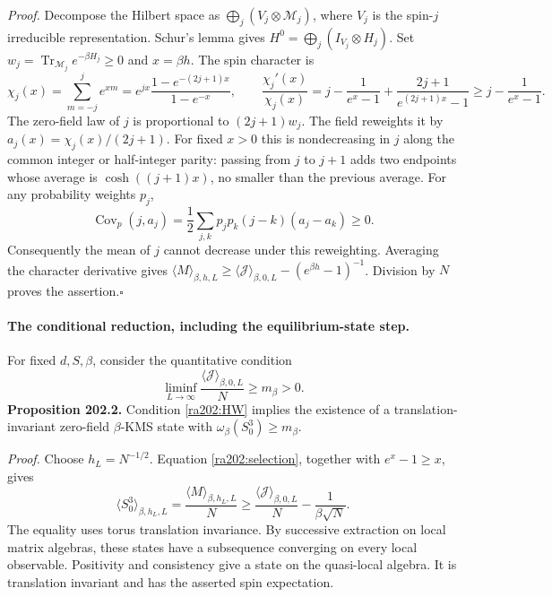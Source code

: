 \documentclass[11pt]{article}
\begin{document}
	\emph{Proof.}
	Decompose the Hilbert space as
	$\bigoplus_j(V_j\otimes\mathcal M_j)$, where $V_j$ is the spin-$j$
	irreducible representation. Schur's lemma gives
	$H^0=\bigoplus_j(I_{V_j}\otimes H_j)$. Set
	$w_j=\operatorname{Tr}_{\mathcal M_j}e^{-\beta H_j}\geq0$ and $x=\beta h$.
	The spin character is
	\[
	\chi_j(x)=\sum_{m=-j}^j e^{xm}
	=e^{jx}\frac{1-e^{-(2j+1)x}}{1-e^{-x}},
	\qquad
	\frac{\chi_j'(x)}{\chi_j(x)}
	=j-\frac1{e^x-1}+\frac{2j+1}{e^{(2j+1)x}-1}
	\geq j-\frac1{e^x-1}.
	\]
	The zero-field law of $j$ is proportional to $(2j+1)w_j$. The field
	reweights it by $a_j(x)=\chi_j(x)/(2j+1)$. For fixed $x>0$ this is
	nondecreasing in $j$ along the common integer or half-integer parity:
	passing from $j$ to $j+1$ adds two endpoints whose average is
	$\cosh((j+1)x)$, no smaller than the previous average. For any probability
	weights $p_j$,
	\[
	\operatorname{Cov}_p(j,a_j)
	=\frac12\sum_{j,k}p_jp_k(j-k)(a_j-a_k)\geq0.
	\]
	Consequently the mean of $j$ cannot decrease under this reweighting.
	Averaging the character derivative gives
	$\langle M\rangle_{\beta,h,L}\geq
	\langle\mathcal J\rangle_{\beta,0,L}-(e^{\beta h}-1)^{-1}$.
	Division by $N$ proves the assertion.\hfill$\square$
	
	\paragraph{The conditional reduction, including the equilibrium-state step.}
	For fixed $d,S,\beta$, consider the quantitative condition
	\begin{equation}\label{ra202:HW}
		\liminf_{L\to\infty}
		\frac{\langle\mathcal J\rangle_{\beta,0,L}}{N}
		\geq m_\beta>0. \tag{HW}
	\end{equation}
	\textbf{Proposition 202.2.} Condition \eqref{ra202:HW} implies the
	existence of a translation-invariant zero-field $\beta$-KMS state with
	$\omega_\beta(S_0^3)\geq m_\beta$.
	
	\emph{Proof.}
	Choose $h_L=N^{-1/2}$. Equation \eqref{ra202:selection}, together with
	$e^x-1\geq x$, gives
	\[
	\langle S_0^3\rangle_{\beta,h_L,L}
	=\frac{\langle M\rangle_{\beta,h_L,L}}{N}
	\geq\frac{\langle\mathcal J\rangle_{\beta,0,L}}{N}
	-\frac1{\beta\sqrt N}.
	\]
	The equality uses torus translation invariance. By successive extraction
	on local matrix algebras, these states have a subsequence converging on
	every local observable. Positivity and consistency give a state on the
	quasi-local algebra. It is translation invariant and has the asserted
	spin expectation.
	
\end{document}
